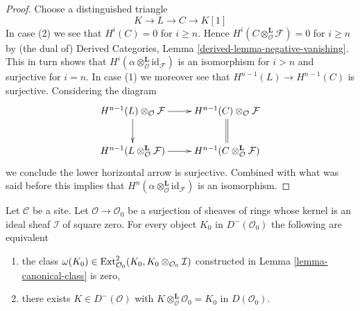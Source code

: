 \begin{proof}
Choose a distinguished triangle
$$
K \to L \to C \to K[1]
$$
In case (2) we see that $H^i(C) = 0$ for $i \geq n$.
Hence $H^i(C \otimes_\mathcal{O}^\mathbf{L} \mathcal{F}) = 0$
for $i \geq n$ by (the dual of)
Derived Categories, Lemma \ref{derived-lemma-negative-vanishing}.
This in turn shows that
$H^i(\alpha \otimes_\mathcal{O}^\mathbf{L} \text{id}_\mathcal{F})$
is an isomorphism for $i > n$ and surjective for $i = n$.
In case (1) we moreover see that $H^{n - 1}(L) \to H^{n - 1}(C)$
is surjective. Considering the diagram
$$
\xymatrix{
H^{n - 1}(L) \otimes_\mathcal{O} \mathcal{F} \ar[r] \ar[d] &
H^{n - 1}(C) \otimes_\mathcal{O} \mathcal{F} \ar@{=}[d] \\
H^{n - 1}(L \otimes_\mathcal{O}^\mathbf{L} \mathcal{F}) \ar[r] &
H^{n - 1}(C \otimes_\mathcal{O}^\mathbf{L} \mathcal{F})
}
$$
we conclude the lower horizontal arrow is surjective. Combined with what
was said before this implies that
$H^n(\alpha \otimes_\mathcal{O}^\mathbf{L} \text{id}_\mathcal{F})$
is an isomorphism.
\end{proof}

\begin{lemma}
\label{lemma-canonical-class-obstruction}
Let $\mathcal{C}$ be a site. Let $\mathcal{O} \to \mathcal{O}_0$
be a surjection of sheaves of rings whose kernel is an ideal sheaf
$\mathcal{I}$ of square zero. For every object
$K_0$ in $D^-(\mathcal{O}_0)$ the following are equivalent
\begin{enumerate}
\item  the class
$\omega(K_0) \in
\mathop{\mathrm{Ext}}\nolimits^2_{\mathcal{O}_0}(K_0, K_0 \otimes_{\mathcal{O}_0} \mathcal{I})$
constructed in Lemma \ref{lemma-canonical-class} is zero,
\item there exists $K \in D^-(\mathcal{O})$ with
$K \otimes_\mathcal{O}^\mathbf{L} \mathcal{O}_0 = K_0$
in $D(\mathcal{O}_0)$.
\end{enumerate}
\end{lemma}

